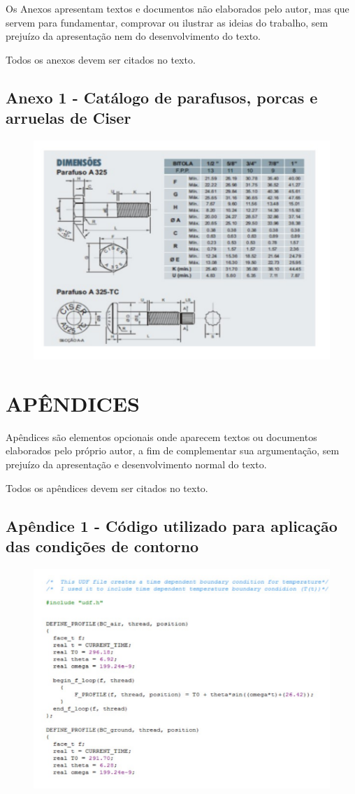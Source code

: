 \documentclass[a4paper,12pt,oneside]{article}
\numberwithin{equation}{section}
\begin{document}
Os Anexos apresentam textos e documentos não elaborados pelo autor, mas que servem para fundamentar, comprovar ou ilustrar as ideias do trabalho, sem prejuízo da apresentação nem do desenvolvimento do texto.

Todos os anexos devem ser citados no texto.


\subsection{Anexo 1 - Catálogo de parafusos, porcas e arruelas de Ciser}
\begin{figure}[h]
\centering
\includegraphics[width=1\linewidth]{img/catalogo}
\end{figure}

\section{APÊNDICES}

Apêndices são elementos opcionais onde aparecem textos ou documentos elaborados pelo próprio autor, a fim de complementar sua argumentação, sem prejuízo da apresentação e
desenvolvimento normal do texto.


Todos os apêndices devem ser citados no texto.


\subsection{Apêndice 1 - Código utilizado para aplicação das condições de contorno}

\begin{figure}[h]
\centering
\includegraphics[width=1\linewidth]{img/codigo}
\end{figure}
\end{document}
